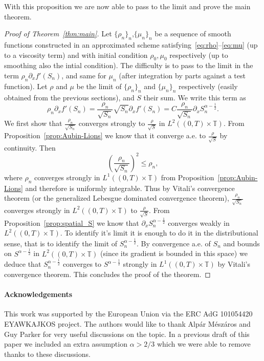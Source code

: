 \documentclass[a4paper,twosided, 11pt]{article}
\newcommand {\T}  { {\mathbb{T}} }
\theoremstyle{plain}
\theoremstyle{remark}
\numberwithin{equation}{section}
\begin{document}
With this proposition we are now able to pass to the limit and prove the main theorem. 

\begin{proof}[Proof of Theorem~\ref{thm:main}]
Let $\{\rho_n\}_n$,$\{\mu_n\}_n$ be a sequence of smooth functions constructed in an approximated scheme satisfying~\eqref{eq:rho}--\eqref{eq:mu} (up to a viscosity term) and with initial condition $\rho_{0},\mu_0$ respectively (up to smoothing also the intial condition). The difficulty is to pass to the limit in the term $\rho_n\partial_x f'(S_n)$, and same for $\mu_n$ (after integration by parts against a test function). Let $\rho$ and $\mu$ be the limit of $\{\rho_n\}_n$ and $\{\mu_n\}_n$ respectively (easily obtained from the previous sections), and $S$ their sum. 
We write this term as 
$$
\rho_n\partial_x f'(S_n)= \frac{\rho_n}{\sqrt{S_n}}\sqrt{S_n}\partial_x f'(S_n) =C\frac{\rho_n}{\sqrt{S_n}}\partial_x S_n^{\alpha-\frac{1}{2}}.
$$
We first show that $\frac{\rho_n}{\sqrt{S_n}}$ converges strongly to $\frac{\rho}{\sqrt{S}}$ in $L^2((0,T)\times \T)$. From Proposition~\ref{prop:Aubin-Lions} we know that it converge a.e. to $\frac{\rho}{\sqrt{S}}$ by continuity. Then 
$$
\left(\frac{\rho_n}{\sqrt{S_n}}\right)^2\le \rho_n,
$$
where $\rho_n$ converges strongly in $L^{1}((0,T)\times\T)$ from Proposition~\ref{prop:Aubin-Lions} and therefore is uniformly integrable. Thus by Vitali's convergence theorem (or the generalized Lebesgue dominated convergence theorem), $\frac{\rho_n}{\sqrt{S_n}}$ converges strongly in $L^2((0,T)\times \T)$ to $\frac{\rho}{\sqrt{S}}$. From Proposition~\ref{prop:spatial_S} we know that $\partial_x S_n^{\alpha-\frac{1}{2}}$ converges weakly in $L^{2}((0,T)\times \T)$. To identify it's limit it is enough to do it in the distributional sense, that is to identify the limit of $S_n^{\alpha-\frac{1}{2}}$. By convergence a.e. of $S_n$ and bounds on $S^{\alpha-\frac{1}{2}}$ in $L^{2}((0,T)\times \T)$ (since its gradient is bounded in this space) we deduce that $S_n^{\alpha-\frac{1}{2}}$ converges to $S^{\alpha-\frac{1}{2}}$ strongly in $L^{1}((0,T)\times \T)$ by Vitali's convergence theorem. This concludes the proof of the theorem. 
\end{proof}

\paragraph{Acknowledgements}
This work was supported by the European Union via the ERC
AdG 101054420 EYAWKAJKOS project.
The authors would like to thank Alpár Mészáros and Guy Parker for very useful discussions on the topic. In a previous draft of this paper we included an extra assumption $\alpha>2/3$ which we were able to remove thanks to these discussions. 


\end{document}
